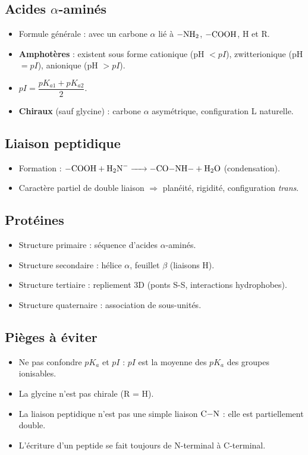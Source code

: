 \begin{synthese}
\subsection*{Acides $\alpha$-aminés}
\begin{itemize}
    \item Formule générale :  avec un carbone $\alpha$ lié à $\ce{-NH2}$, $\ce{-COOH}$, H et R.
    \item \textbf{Amphotères} : existent sous forme cationique (pH $< pI$), zwitterionique (pH $= pI$), anionique (pH $> pI$).
    \item $pI = \dfrac{pK_{a1} + pK_{a2}}{2}$.
    \item \textbf{Chiraux} (sauf glycine) : carbone $\alpha$ asymétrique, configuration L naturelle.
\end{itemize}

\subsection*{Liaison peptidique}
\begin{itemize}
    \item Formation : $\ce{-COOH + H2N- -> -CO-NH- + H2O}$ (condensation).
    \item Caractère partiel de double liaison $\Rightarrow$ planéité, rigidité, configuration \textit{trans}.
\end{itemize}

\subsection*{Protéines}
\begin{itemize}
    \item Structure primaire : séquence d'acides $\alpha$-aminés.
    \item Structure secondaire : hélice $\alpha$, feuillet $\beta$ (liaisons H).
    \item Structure tertiaire : repliement 3D (ponts S-S, interactions hydrophobes).
    \item Structure quaternaire : association de sous-unités.
\end{itemize}

\subsection*{Pièges à éviter}
\begin{itemize}
    \item Ne pas confondre $pK_a$ et $pI$ : $pI$ est la moyenne des $pK_a$ des groupes ionisables.
    \item La glycine n'est pas chirale (R = H).
    \item La liaison peptidique n'est pas une simple liaison $\ce{C-N}$ : elle est partiellement double.
    \item L'écriture d'un peptide se fait toujours de N-terminal à C-terminal.
\end{itemize}
\end{synthese}

